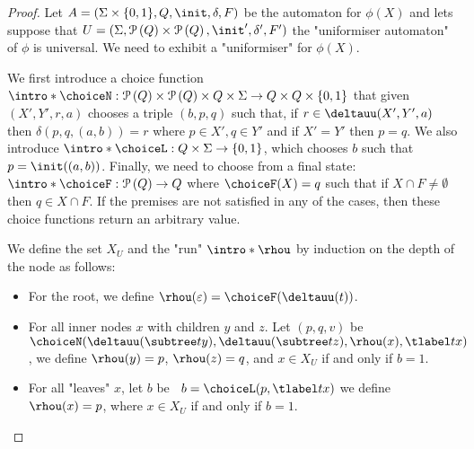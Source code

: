 \documentclass[a4paper,UKenglish,cleveref, autoref, thm-restate]{lipics-v2021}
\begin{document}
\begin{proof}
	Let $A =  (\Sigma \times \{0,1\}, Q, \init, \delta, F)$ be the automaton for $\phi(X)$ and lets suppose that
	$U = (\Sigma, \parts Q \times \parts Q,\init', \delta', F')$ the "uniformiser automaton" of $\phi$ is universal.
	We need to exhibit a "uniformiser" for $\phi(X)$.

	We first introduce a choice function $\intro*\choiceN : \parts Q \times \parts Q \times Q \times \Sigma \to Q \times Q \times \set{0,1}$
	that given $(X',Y',r,a)$ chooses a triple $(b,p,q)$ such that, if $r \in \deltauu(X',Y', a)$ then $\delta(p,q,(a,b)) = r$ where $p \in X', q \in Y'$
	and if $X' = Y'$ then $p = q$.
	We also introduce $\intro* \choiceL : Q \times \Sigma \to \set{0,1} $, which chooses
	$b$ such that $p = \init((a,b))$.
	Finally, we need to choose from a final state: $\intro* \choiceF : \parts Q \to  Q$ where
	$\choiceF (X) = q$ such that if $X \cap F \neq \emptyset$ then $q \in X \cap F$. If the premises are not satisfied in any of the cases, then
	these choice functions return an arbitrary value.

	We define the set $X_U$ and the "run" $\intro*\rhou$  by induction on the depth of the node as follows:
	\begin{itemize}
		\item For the root, we define $\rhou(\varepsilon) = \choiceF(\deltauu(t))$.
		\item For all inner nodes $x$ with children $y$ and $z$. Let $(p,q,v)$ be~$\choiceN(\deltauu(\subtree t y), \deltauu(\subtree t z), \rhou(x), \tlabel t x)$, we define
		      $\rhou(y)=p$, $\rhou(z)=q$, and $x \in X_U$ if and only if $b = 1$.
		\item For all "leaves" $x$, let $b$ be ~$b = \choiceL(p, \tlabel t x)$ we define $\rhou (x) = p$, where $x \in X_U$ if and only if $b = 1$.
	\end{itemize}


\end{proof}
\end{document}
